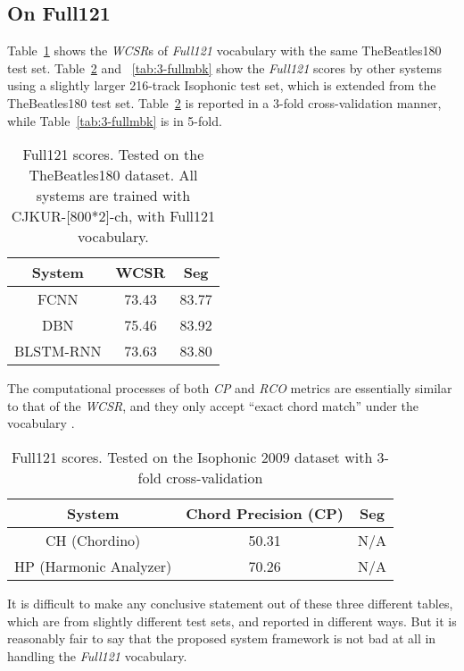 \subsection{On Full121}
Table~\ref{tab:3-full} shows the \textit{WCSR}s of \textit{Full121} vocabulary with the same TheBeatles180 test set. Table~\ref{tab:3-fullhp} and ~\ref{tab:3-fullmbk} show the \textit{Full121} scores by other systems using a slightly larger 216-track Isophonic test set, which is extended from the TheBeatles180 test set. Table~\ref{tab:3-fullhp} is reported in a 3-fold cross-validation manner, while Table~\ref{tab:3-fullmbk} is in 5-fold.
\begin{table}[h]
\footnotesize
\centering
\begin{tabular}{|c|c|c|}\hline
System & WCSR & Seg \\ \hline
FCNN & 73.43 & 83.77 \\ \hline
DBN & 75.46 & 83.92 \\ \hline
BLSTM-RNN & 73.63 & 83.80 \\ \hline
\end{tabular}
\caption{Full121 scores. Tested on the TheBeatles180 dataset. All systems are trained with CJKUR-[800*2]-ch, with Full121 vocabulary.}
\label{tab:3-full}
\end{table}

The computational processes of both \textit{CP} and \textit{RCO} metrics are essentially similar to that of the \textit{WCSR}, and they only accept ``exact chord match'' under the vocabulary \cite{ni2012end,mauch2010automatic}.
\begin{table}[h]
\footnotesize
\centering
\begin{tabular}{|c|c|c|}\hline
System & Chord Precision (CP) & Seg \\ \hline
CH (Chordino) & 50.31 & N/A \\ \hline
HP (Harmonic Analyzer) & 70.26 & N/A\\ \hline
\end{tabular}
\caption{Full121 scores. Tested on the Isophonic 2009 dataset with 3-fold cross-validation\cite{ni2012end}}
\label{tab:3-fullhp}
\end{table}

It is difficult to make any conclusive statement out of these three different tables, which are from slightly different test sets, and reported in different ways. But it is reasonably fair to say that the proposed system framework is not bad at all in handling the \textit{Full121} vocabulary.

